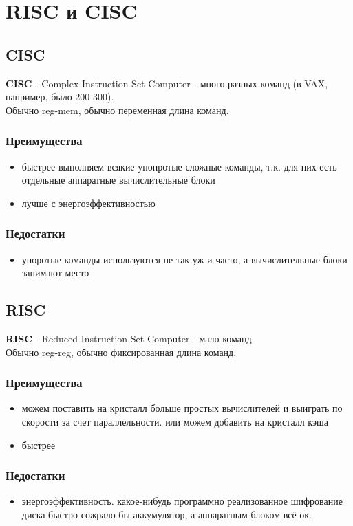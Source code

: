 \documentclass[12pt, a4paper]{article}
\begin{document}
\section{RISC и CISC}
\subsection{CISC}
\textbf{CISC} - Complex Instruction Set Computer - много разных команд (в VAX, например, было 200-300).\\
Обычно reg-mem, обычно переменная длина команд.
\subsubsection{Преимущества}
\begin{itemize}
    \item быстрее выполняем всякие упопротые сложные команды, т.к. для них есть отдельные аппаратные вычислительные блоки
    \item лучше с энергоэффективностью
\end{itemize}
\subsubsection{Недостатки}
\begin{itemize}
    \item упоротые команды используются не так уж и часто, а вычислительные блоки занимают место 
\end{itemize}
\subsection{RISC}
\textbf{RISC} - Reduced Instruction Set Computer - мало команд.\\
Обычно reg-reg, обычно фиксированная длина команд.
\subsubsection{Преимущества}
\begin{itemize}
    \item можем поставить на кристалл больше простых вычислителей и выиграть по скорости за счет параллельности. или можем добавить на кристалл кэша
    \item быстрее
\end{itemize}
\subsubsection{Недостатки}
\begin{itemize}
    \item энергоэффективность. какое-нибудь программно реализованное шифрование диска быстро сожрало бы аккумулятор, а аппаратным блоком всё ок.
\end{itemize}
\end{document}
